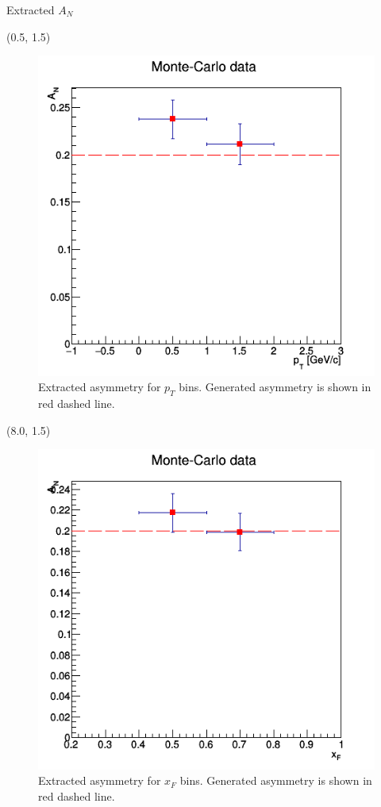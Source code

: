 \documentclass[11pt, xcolor={dvipsnames}, aspectratio = 169]{beamer}
\begin{document}
\begin{frame}{Extracted $A_{N}$}

\begin{textblock}{7.0}(0.5, 1.5)
\begin{figure}
    \centering
    \includegraphics[width = 1.0\linewidth]{imgs/final_asym_pt.png}
    \caption{Extracted asymmetry for $p_{T}$ bins. Generated asymmetry is shown in red dashed line.}
\end{figure}
\end{textblock}

\begin{textblock}{7.0}(8.0, 1.5)
\begin{figure}
    \centering
    \includegraphics[width = 1.0\linewidth]{imgs/final_asym_xf.png}
    \caption{Extracted asymmetry for $x_{F}$ bins. Generated asymmetry is shown in red dashed line.}
\end{figure}
\end{textblock}


\end{frame}
\end{document}
